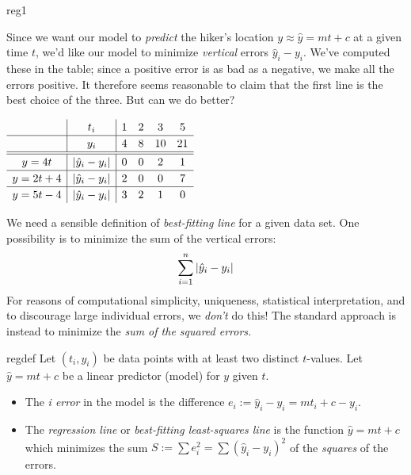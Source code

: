 \begin{example}{}{reg1}
	\begin{minipage}[t]{0.59\linewidth}\vspace{-10pt}
		Since we want our model to \emph{predict} the hiker's location $y\approx \hat y=mt+c$ at a given time $t$, we'd like our model to minimize \emph{vertical} errors $\hat y_i-y_i$. We've computed these in the table; since a positive error is as bad as a negative, we make all the errors positive. It therefore seems reasonable to claim that the first line is the best choice of the three.\smallbreak
		But can we do better?
	\end{minipage}
	\hfill
	\begin{minipage}[t]{0.4\linewidth}\vspace{0pt}
		\flushright $\def\arraystretch{1.2}
		\begin{array}[t]{c|c|ccccc}
			&t_i&1&2&3&5\\\hline
			&y_i&4&8&10&21\\\hline\hline
			y=4t&\nm{\hat y_i-y_i}&0&0&2&1\\\hline
			y=2t+4&\nm{\hat y_i-y_i}&2&0&0&7\\\hline
			y=5t-4&\nm{\hat y_i-y_i}&3&2&1&0
		\end{array}$
	\end{minipage}
\end{example}


\goodbreak

We need a sensible definition of \emph{best-fitting line} for a given data set. One possibility is to minimize the sum of the vertical errors:
\[
	\sum_{i=1}^n\left| \hat y_i-y_i\right|
\]
For reasons of computational simplicity, uniqueness, statistical interpretation, and to discourage large individual errors, we \emph{don't} do this! The standard approach is instead to minimize the \emph{sum of the squared errors.}


\begin{defn}{}{regdef}
	Let $(t_i,y_i)$ be data points with at least two distinct $t$-values. Let $\hat y=mt+c$ be a linear predictor (model) for $y$ given $t$.
	\begin{itemize}\itemsep0pt
	  \item The \emph{i\th{} error} in the model is the difference $e_i:=\hat y_i-y_i=mt_i+c-y_i$.
	  \item The \emph{regression line} or \emph{best-fitting least-squares line} is the function $\hat y=mt+c$ which minimizes the sum $S:=\sum e_i^2 =\sum (\hat y_i-y_i)^2$ of the \emph{squares} of the errors.
	\end{itemize}
\end{defn}

